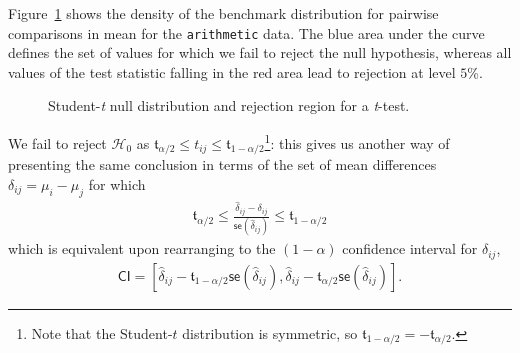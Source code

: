 \documentclass[
  11pt,
  letterpaper,
]{scrbook}
\theoremstyle{definition}
\theoremstyle{definition}
\theoremstyle{remark}
\begin{document}
Figure~\ref{fig-tcurve} shows the density of the benchmark distribution
for pairwise comparisons in mean for the \texttt{arithmetic} data. The
blue area under the curve defines the set of values for which we fail to
reject the null hypothesis, whereas all values of the test statistic
falling in the red area lead to rejection at level \(5\)\%.

\begin{figure}[ht!]


\caption{\label{fig-tcurve}Student-\emph{t} null distribution and
rejection region for a \emph{t}-test.}

\end{figure}%

We fail to reject \(\mathscr{H}_0\) as
\(\mathfrak{t}_{\alpha/2} \leq t_{ij} \leq \mathfrak{t}_{1-\alpha/2}\)\footnote{Note
  that the Student-\(t\) distribution is symmetric, so
  \(\mathfrak{t}_{1-\alpha/2} = -\mathfrak{t}_{\alpha/2}\).}: this gives
us another way of presenting the same conclusion in terms of the set of
mean differences \(\delta_{ij} = \mu_i - \mu_j\) for which
\begin{align*}
 \mathfrak{t}_{\alpha/2} \leq \frac{\widehat{\delta}_{ij} - \delta_{ij}}{\mathsf{se}\left(\widehat{\delta}_{ij}\right)} \leq \mathfrak{t}_{1-\alpha/2}
\end{align*} which is equivalent upon rearranging to the \((1-\alpha)\)
confidence interval for \(\delta_{ij}\), \begin{align*}
\mathsf{CI} = \left[\widehat{\delta}_{ij} - \mathfrak{t}_{1-\alpha/2}\mathsf{se}\left(\widehat{\delta}_{ij}\right), \widehat{\delta}_{ij} - \mathfrak{t}_{\alpha/2}\mathsf{se}\left(\widehat{\delta}_{ij}\right)\right].
\end{align*}
\end{document}
